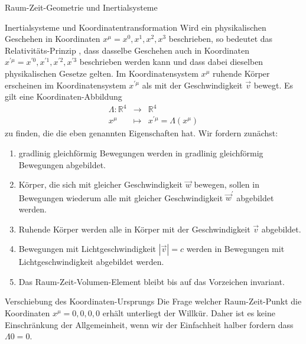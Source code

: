 \begin{chapter}{\titlestr}
\begin{section}{Raum-Zeit-Geometrie und Inertialsysteme}
\begin{subsection}{Inertialsysteme und Koordinatentransformation}
Wird ein physikalischen Geschehen in Koordinaten $x^\mu=x^0,x^1,x^2,x^3$ beschrieben, so bedeutet das Relativitäts-Prinzip
, dass dasselbe Geschehen auch in Koordinaten $x^{\prime\mu}=x^{\prime 0},x^{\prime 1},x^{\prime 2},x^{\prime 3}$
beschrieben werden kann und dass dabei dieselben physikalischen Gesetze gelten. Im Koordinatensystem $x^\mu$ ruhende Körper
erscheinen im Koordinatensystem $x^{\prime\mu}$ als mit der Geschwindigkeit $\vec{v}$ bewegt.
Es gilt eine Koordinaten-Abbildung
\begin{eqnarray*}
\Lambda: \mathbb{R}^4 &\rightarrow& \mathbb{R}^4\\
x^\mu &\mapsto& x^{\prime\mu} = \Lambda(x^\mu)
\end{eqnarray*}
zu finden, die die eben genannten Eigenschaften hat. Wir fordern zunächst:
\begin{enumerate}
\label{lorentz_conditions}
	\item gradlinig gleichförmig Bewegungen werden in gradlinig gleichförmig Bewegungen abgebildet.
	\item Körper, die sich mit gleicher Geschwindigkeit $\vec{w}$ bewegen, sollen in Bewegungen wiederum alle mit gleicher Geschwindigkeit
	$\vec{w}^\prime$ abgebildet werden.
	\item Ruhende Körper werden alle in Körper mit der Geschwindigkeit $\vec{v}$ abgebildet.
	\item Bewegungen mit Lichtgeschwindigkeit $|\vec{v}|=c$ werden in Bewegungen mit Lichtgeschwindigkeit abgebildet werden.
	\item Das Raum-Zeit-Volumen-Element bleibt bis auf das Vorzeichen invariant.
\end{enumerate}
\end{subsection}

\begin{subsection}{Verschiebung des Koordinaten-Ursprungs}
Die Frage welcher Raum-Zeit-Punkt die Koordinaten $x^\mu=0,0,0,0$ erhält unterliegt der Willkür. Daher ist es keine Einschränkung der Allgemeinheit, wenn wir der Einfachheit halber fordern dass $\Lambda 0 = 0$.
\end{subsection}


\end{section}
\end{chapter}
